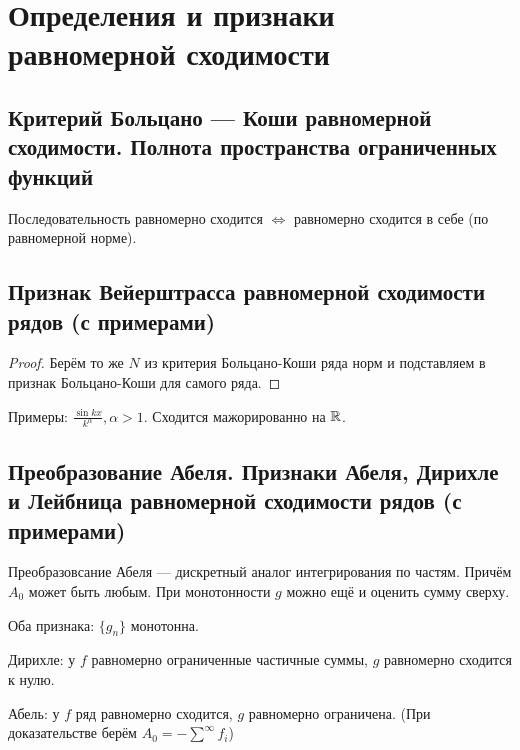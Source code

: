 \documentclass[12pt, a4paper, oneside]{memoir}
\begin{document}
\section{Определения и признаки равномерной сходимости}

\subsection{Критерий Больцано — Коши равномерной сходимости. Полнота пространства ограниченных функций}

\begin{theorem}

    Последовательность равномерно сходится $\Leftrightarrow$ равномерно сходится в себе (по равномерной норме).
\end{theorem}

\subsection{Признак Вейерштрасса равномерной сходимости рядов (с примерами)}

\begin{theorem}
    
    \begin{proof}
        Берём то же $N$ из критерия Больцано-Коши ряда норм и подставляем в признак Больцано-Коши для самого ряда.
    \end{proof}
\end{theorem} 

Примеры: $\frac{\sin kx}{k^\alpha}, \alpha > 1$. Сходится мажорированно на ${\mathbb{R}}$.

\subsection{Преобразование Абеля. Признаки Абеля, Дирихле и Лейбница равномерной сходимости рядов
 (с примерами)}

Преобразовсание Абеля — дискретный аналог интегрирования по частям. Причём $A_0$ может быть любым.
При монотонности $g$ можно ещё и оценить сумму сверху.

Оба признака: $\{g_n\}$ монотонна.

Дирихле: у $f$ равномерно ограниченные частичные суммы, $g$ равномерно сходится к нулю.

Абель: у $f$ ряд равномерно сходится, $g$ равномерно ограничена. (При доказательстве берём $A_0 = -\sum^\infty f_i$)
\end{document}
